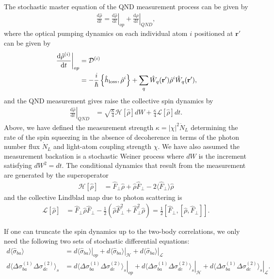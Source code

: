 \documentclass[pra,twocolumn,floatfix,superscriptaddress]{revtex4-1} %
\newcommand{\dt}[1]{\frac{{\mathrm d} {#1}}{{\mathrm d}t}}
\def\br{\mathbf{r}}
\newcommand{\expect}[1]{\big\langle #1 \big\rangle}
\begin{document}
The stochastic master equation of the QND measurement process can be given by
\begin{align}
\dt{\hat{\rho}}=\left.\dt{\hat{\rho}}\right|_{op} + \left.\dt{\hat{\rho}}\right|_{QND},
\end{align}
where the optical pumping dynamics on each individual atom $i$ positioned at $\br'$ can be given by
\begin{align}
\left.\dt{\hat{\rho}^{(i)}}\right|_{op} &=\mathcal{D}^{(i)}\\
&= -\frac{i}{\hbar} \left\{\hat{h}_{\rm loss},\hat{\rho}^{i} \right\} + \sum_q \hat{W}_q(\br')\hat{\rho}^{i}\hat{W}_q(\br'),
\end{align}
and the QND measurement gives raise the collective spin dynamics by
\begin{align}
\left.\dt{\hat{\rho}}\right|_{QND} &= \sqrt{\frac{\kappa}{4}}\mathcal{H}\left[\hat{\rho} \right]dW + \frac{\kappa}{4}\mathcal{L}\left[ \hat{\rho}\right]dt.
\end{align}
Above, we have defined the measurement strength $\kappa =|\chi|^2\dot{N}_L $ determining the rate of the spin squeezing in the absence of decoherence in terms of the photon number flux $\dot{N}_L$ and light-atom coupling strength $\chi$. We have also assumed the measurement backation is a stochastic Weiner process where $dW$ is the increment satisfying $dW^2 = dt$. The conditional dynamics that result from the measurement are generated by the superoperator
\begin{align}
\mathcal{H}\left[ \hat{\rho}\right] &= \hat{F}_\perp\hat{\rho} + \hat{\rho}\hat{F}_\perp -2\expect{\hat{F}_\perp}\hat{\rho}
\end{align}
and the collective Lindblad map due to photon scattering is
\begin{align}
\mathcal{L}\left[ \hat{\rho} \right] &= \hat{F}_\perp\hat{\rho}\hat{F}_\perp-\frac{1}{2}\left(\hat{\rho}\hat{F}_\perp^2+\hat{F}_\perp^2\hat{\rho} \right)=\frac{1}{2}\left[\hat{F}_\perp,\left[\hat{\rho},\hat{F}_\perp \right] \right].
\end{align}

If one can truncate the spin dynamics up to the two-body correlations, we only need the following two sets of stochastic differential equations:
\begin{subequations}
\begin{align}
d\expect{\hat{\sigma}_{ba}} &=\left. d{\expect{\hat{\sigma}_{ba}}}\right|_{op} + \left. d{\expect{\hat{\sigma}_{ba}}}\right|_{\mathcal{H}}+\left. d{\expect{\hat{\sigma}_{ba}}}\right|_{\mathcal{L}} \\
d\expect{\Delta \sigma_{ba}^{(1)}\Delta \sigma_{dc}^{(2)}}_s &= \left. d{\expect{\Delta \sigma_{ba}^{(1)}\Delta \sigma_{dc}^{(2)}}_s}\right|_{op} + \left. d{\expect{\Delta \sigma_{ba}^{(1)}\Delta \sigma_{dc}^{(2)}}_s}\right|_{\mathcal{H}} + \left. d{\expect{\Delta \sigma_{ba}^{(1)}\Delta \sigma_{dc}^{(2)}}_s}\right|_{\mathcal{L}}.
\end{align}
\end{subequations}
\end{document}
